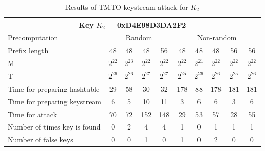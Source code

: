\begin{table}[ht!]
\begin{center}
\begin{tabular}{|p{3cm}||c|c|c|c|c|c|c|c|c|}
\hline
\multicolumn{10}{|c|}{\textbf{Key $K_2$ = 0xD4E98D3DA2F2}} \\ \hline \hline
Precomputation 	& \multicolumn{4}{c|}{Random} & \multicolumn{5}{c|}{Non-random} \\ \hline
Prefix length										&	48 				&	48 				&	48 				&	56 				&	48 				&	48				&	48 				&	56 				&	56  			\\ \hline
M																&	$2^{22}$ 	&	$2^{23}$ 	&	$2^{22}$ 	&	$2^{22}$ 	&	$2^{22}$ 	&	$2^{21}$ 	&	$2^{22}$ 	&	$2^{22}$ 	& $2^{22}$	\\ \hline
T	  														&	$2^{26}$ 	&	$2^{26}$ 	&	$2^{27}$ 	&	$2^{27}$	&	$2^{25}$ 	&	$2^{26}$ 	&	$2^{26}$ 	& $2^{25}$ 	& $2^{26}$	\\ \hline
Time for preparing hashtable		&	29 				&	58 				&	30 				&	32 				&	178 			&	88				& 178				&	181 			& 181				\\ \hline
Time for preparing keystream		&	6 				&	5 				&	10 				&	11 				&	3 				&	6					& 6					&	3					& 6					\\ \hline
Time for attack									&	70 				&	72 				&	152 			&	148 			&	29 				&	53				& 57 				&	28 				& 55				\\ \hline
Number of times key is found		&	0 				&	2 				&	4 				&	4 				&	1 				&	0					& 1 				&	1 				& 1					\\ \hline
Number of false keys						&	0 				&	0 				&	1 				&	0 				&	1 				&	0					& 2 				& 0 				& 0					\\ \hline
\end{tabular}
\end{center}
\caption{Results of TMTO keystream attack for $K_2$}
\label{tab:keystream-attack-results-key2}
\end{table}


